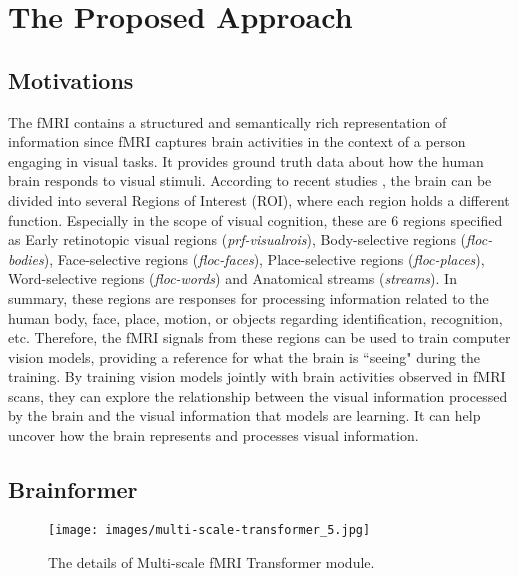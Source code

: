 \section{The Proposed Approach}
\label{sec:method}




\subsection{Motivations}
\label{sec:motivation}

\noindent
The fMRI contains a structured and semantically rich representation of information since fMRI captures brain activities in the context of a person engaging in visual tasks. It provides ground truth data about how the human brain responds to visual stimuli. According to recent studies \cite{press2001visual, kanwisher2001faces, dwivedi2021unveiling}, the brain can be divided into several Regions of Interest (ROI), where each region holds a different function. Especially in the scope of visual cognition, these are 6 regions specified as Early retinotopic visual regions (\textit{prf-visualrois}), Body-selective regions (\textit{floc-bodies}), Face-selective regions (\textit{floc-faces}), Place-selective regions (\textit{floc-places}), Word-selective regions (\textit{floc-words}) and Anatomical streams (\textit{streams}). 
In summary, these regions are responses for processing information related to the human body, face, place, motion, or objects regarding identification, recognition, etc. Therefore, the fMRI signals from these regions can be used to train computer vision models, providing a reference for what the brain is ``seeing" during the training. By training vision models jointly with brain activities observed in fMRI scans, they can explore the relationship between the visual information processed by the brain and the visual information that models are learning. It can help uncover how the brain represents and processes visual information.









\subsection{Brainformer}


\begin{figure*}[!t]
    \centering
    \texttt{[image: images/multi-scale-transformer\_5.jpg]}
    \vspace{-5mm}
    \caption{The details of Multi-scale fMRI Transformer module.}
    \label{fig:multi_scale}
    \vspace{-5mm}
\end{figure*}

